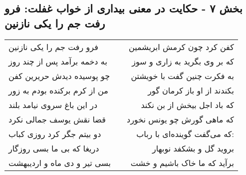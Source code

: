 \begin{center}
\section*{بخش ۷ - حکایت در معنی بیداری از خواب غفلت: فرو رفت جم را یکی نازنین}
\label{sec:007}
\begin{longtable}{l p{0.5cm} r}
فرو رفت جم را یکی نازنین
&&
کفن کرد چون کرمش ابریشمین
\\
به دخمه برآمد پس از چند روز
&&
که بر وی بگرید به زاری و سوز
\\
چو پوسیده دیدش حریرین کفن
&&
به فکرت چنین گفت با خویشتن
\\
من از کرم برکنده بودم به زور
&&
بکندند از او باز کرمان گور
\\
در این باغ سروی نیامد بلند
&&
که باد اجل بیخش از بن نکند
\\
قضا نقش یوسف جمالی نکرد
&&
که ماهی گورش چو یونس نخورد
\\
دو بیتم جگر کرد روزی کباب
&&
که می‌گفت گوینده‌ای با رباب:
\\
دریغا که بی ما بسی روزگار
&&
بروید گل و بشکفد نوبهار
\\
بسی تیر و دی ماه و اردیبهشت
&&
برآید که ما خاک باشیم و خشت
\\
\end{longtable}
\end{center}
